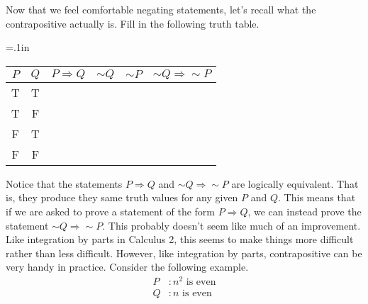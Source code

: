 \documentclass[12 pt]{article}
\newcommand{\R}{\mathbb{R}}
\newcommand{\Z}{\mathbb{Z}}
\newcommand{\N}{\mathbb{N}}
\newcommand{\set}[1]{\left\{#1\right\}}
\theoremstyle{definition}
\theoremstyle{plain}
\theoremstyle{mytheorem}
\theoremstyle{myexample}
\theoremstyle{mydefinition}
\begin{document}
\begin{enumerate}



\end{enumerate}

\noindent Now that we feel comfortable negating statements, let's recall what the contrapositive actually is.  Fill in the following truth table.

\begin{center}
{\tabulinesep=.1in
	\begin{tabu}{c|c|c|c|c|c}
	$P$ & $Q$ & $P \Rightarrow Q$ & $\sim Q$ & $\sim P$ & $\sim Q \Rightarrow \sim P$\\
	\hline
	T & T & \ & \ & \ & \ \\
	T & F & \ & \ & \ & \ \\
	F & T & \ & \ & \ & \ \\
	F & F & \ & \ & \ & \ \\
	\end{tabu}}
\end{center}

Notice that the statements $P \Rightarrow Q$ and $\sim Q \Rightarrow \sim P$ are logically equivalent.  That is, they produce they same truth values for any given $P$ and $Q$.  This means that if we are asked to prove a statement of the form $P \Rightarrow Q$, we can instead prove the statement $\sim Q \Rightarrow \sim P$.  This probably doesn't seem like much of an improvement.  Like integration by parts in Calculus 2, this seems to make things more difficult rather than less difficult. However, like integration by parts, contrapositive can be very handy in practice. Consider the following example.
	\begin{align*}
	P &: \mbox{$n^2$ is even}\\
	Q &: \mbox{$n$ is even}
	\end{align*}
	
\end{document}
